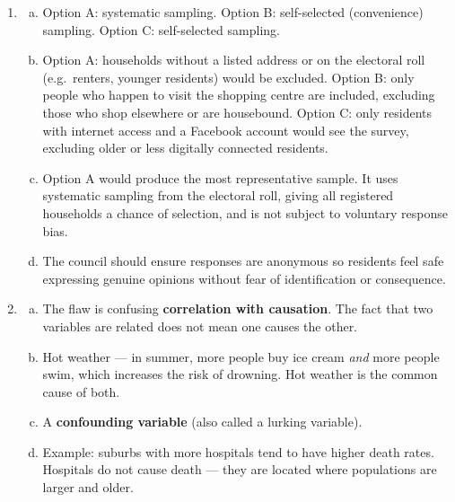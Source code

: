 \documentclass{article}
\begin{document}
\begin{enumerate}
  \item
  \begin{enumerate}[(a)]
    \item Option A: systematic sampling. Option B: self-selected (convenience) sampling.
    Option C: self-selected sampling.
    \item Option A: households without a listed address or on the electoral roll (e.g.\
    renters, younger residents) would be excluded. Option B: only people who happen to visit
    the shopping centre are included, excluding those who shop elsewhere or are housebound.
    Option C: only residents with internet access and a Facebook account would see the survey,
    excluding older or less digitally connected residents.
    \item Option A would produce the most representative sample. It uses systematic sampling
    from the electoral roll, giving all registered households a chance of selection, and is
    not subject to voluntary response bias.
    \item The council should ensure responses are anonymous so residents feel safe expressing
    genuine opinions without fear of identification or consequence.
  \end{enumerate}

  \item
  \begin{enumerate}[(a)]
    \item The flaw is confusing \textbf{correlation with causation}. The fact that two
    variables are related does not mean one causes the other.
    \item Hot weather --- in summer, more people buy ice cream \textit{and} more people swim,
    which increases the risk of drowning. Hot weather is the common cause of both.
    \item A \textbf{confounding variable} (also called a lurking variable).
    \item Example: suburbs with more hospitals tend to have higher death rates. Hospitals do
    not cause death --- they are located where populations are larger and older.
  \end{enumerate}


\end{enumerate}
\end{document}
